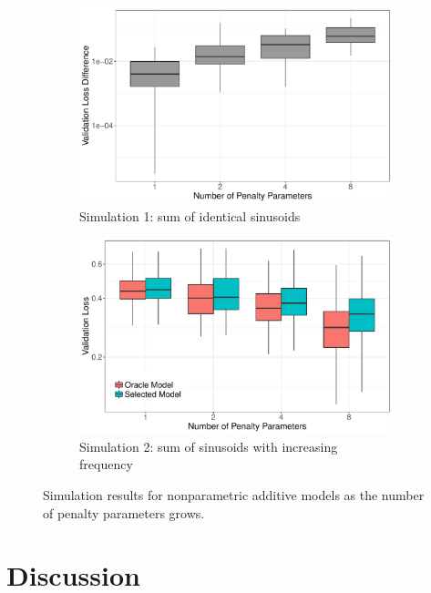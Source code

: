 \documentclass[12pt]{article} %
\theoremstyle{definition}
\begin{document}
\begin{figure}
	\centering
	\begin{subfigure}{0.48\textwidth}
		\includegraphics[width=\textwidth]{../../../R/figures/validation_size_loss_diff_homogeneous.pdf}
		\caption{Simulation 1: sum of identical sinusoids}
	\end{subfigure}
	\begin{subfigure}{0.48\textwidth}
		\includegraphics[width=\textwidth]{../../../R/figures/validation_size_loss_heterogeneous.pdf}
		\caption{Simulation 2: sum of sinusoids with increasing frequency}
	\end{subfigure}
	\caption{
		Simulation results for nonparametric additive models as the number of penalty parameters grows.
	}
	\label{fig:simulations}
\end{figure}

\section{Discussion}\label{sec:discussion}
\end{document}
